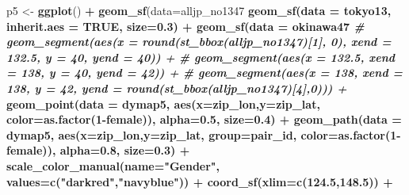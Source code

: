 \documentclass[
]{article}
\newenvironment{Shaded}{\begin{snugshade}}{\end{snugshade}}
\newcommand{\CommentTok}[1]{\textcolor[rgb]{0.56,0.35,0.01}{\textit{#1}}}
\newcommand{\DataTypeTok}[1]{\textcolor[rgb]{0.13,0.29,0.53}{#1}}
\newcommand{\DecValTok}[1]{\textcolor[rgb]{0.00,0.00,0.81}{#1}}
\newcommand{\FloatTok}[1]{\textcolor[rgb]{0.00,0.00,0.81}{#1}}
\newcommand{\KeywordTok}[1]{\textcolor[rgb]{0.13,0.29,0.53}{\textbf{#1}}}
\newcommand{\NormalTok}[1]{#1}
\newcommand{\OperatorTok}[1]{\textcolor[rgb]{0.81,0.36,0.00}{\textbf{#1}}}
\newcommand{\OtherTok}[1]{\textcolor[rgb]{0.56,0.35,0.01}{#1}}
\newcommand{\StringTok}[1]{\textcolor[rgb]{0.31,0.60,0.02}{#1}}
\begin{document}
\begin{Shaded}
\begin{Highlighting}[]
\NormalTok{p5 <-}\StringTok{ }\KeywordTok{ggplot}\NormalTok{() }\OperatorTok{+}\StringTok{ }
\StringTok{  }\KeywordTok{geom_sf}\NormalTok{(}\DataTypeTok{data=}\NormalTok{alljp_no1347 }\OperatorTok{%>%}\StringTok{ }\KeywordTok{st_simplify}\NormalTok{(}\DataTypeTok{dTolerance =} \FloatTok{0.01}\NormalTok{), }\DataTypeTok{size=}\FloatTok{0.3}\NormalTok{) }\OperatorTok{+}\StringTok{ }
\StringTok{  }\KeywordTok{geom_sf}\NormalTok{(}\DataTypeTok{data =}\NormalTok{ tokyo13, }\DataTypeTok{inherit.aes =} \OtherTok{TRUE}\NormalTok{, }\DataTypeTok{size=}\FloatTok{0.3}\NormalTok{) }\OperatorTok{+}\StringTok{ }
\StringTok{  }\KeywordTok{geom_sf}\NormalTok{(}\DataTypeTok{data =}\NormalTok{ okinawa47 }\OperatorTok{%>%}\StringTok{ }\KeywordTok{st_simplify}\NormalTok{(}\DataTypeTok{dTolerance =} \FloatTok{0.01}\NormalTok{), }\DataTypeTok{inherit.aes =} \OtherTok{TRUE}\NormalTok{, }\DataTypeTok{size=}\FloatTok{0.3}\NormalTok{) }\OperatorTok{+}\StringTok{   }
\StringTok{  }\CommentTok{# geom_segment(aes(x = round(st_bbox(alljp_no1347)[1], 0), xend = 132.5, y = 40, yend = 40)) + }
\StringTok{  }\CommentTok{# geom_segment(aes(x = 132.5, xend = 138, y = 40, yend = 42)) + }
\StringTok{  }\CommentTok{# geom_segment(aes(x = 138, xend = 138, y = 42, yend = round(st_bbox(alljp_no1347)[4],0))) + }
\StringTok{  }\KeywordTok{geom_point}\NormalTok{(}\DataTypeTok{data =}\NormalTok{ dymap5, }\KeywordTok{aes}\NormalTok{(}\DataTypeTok{x=}\NormalTok{zip_lon,}\DataTypeTok{y=}\NormalTok{zip_lat, }\DataTypeTok{color=}\KeywordTok{as.factor}\NormalTok{(}\DecValTok{1}\OperatorTok{-}\NormalTok{female)), }\DataTypeTok{alpha=}\FloatTok{0.5}\NormalTok{, }\DataTypeTok{size=}\FloatTok{0.4}\NormalTok{) }\OperatorTok{+}\StringTok{ }
\StringTok{  }\KeywordTok{geom_path}\NormalTok{(}\DataTypeTok{data =}\NormalTok{ dymap5, }\KeywordTok{aes}\NormalTok{(}\DataTypeTok{x=}\NormalTok{zip_lon,}\DataTypeTok{y=}\NormalTok{zip_lat, }\DataTypeTok{group=}\NormalTok{pair_id, }\DataTypeTok{color=}\KeywordTok{as.factor}\NormalTok{(}\DecValTok{1}\OperatorTok{-}\NormalTok{female)), }\DataTypeTok{alpha=}\FloatTok{0.8}\NormalTok{, }\DataTypeTok{size=}\FloatTok{0.3}\NormalTok{) }\OperatorTok{+}\StringTok{ }
\StringTok{  }\KeywordTok{scale_color_manual}\NormalTok{(}\DataTypeTok{name=}\StringTok{"Gender"}\NormalTok{, }\DataTypeTok{values=}\KeywordTok{c}\NormalTok{(}\StringTok{"darkred"}\NormalTok{,}\StringTok{"navyblue"}\NormalTok{)) }\OperatorTok{+}\StringTok{ }
\StringTok{  }\KeywordTok{coord_sf}\NormalTok{(}\DataTypeTok{xlim=}\KeywordTok{c}\NormalTok{(}\FloatTok{124.5}\NormalTok{,}\FloatTok{148.5}\NormalTok{)) }\OperatorTok{+}\StringTok{ }
}}
\end{Highlighting}
\end{Shaded}
\end{document}
